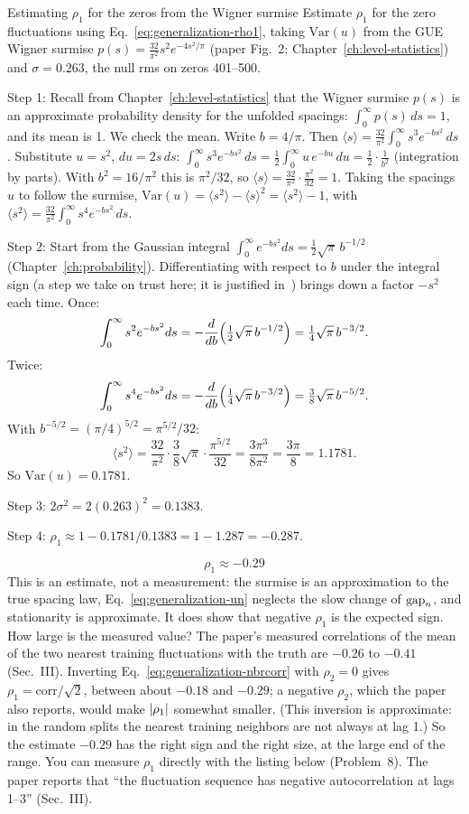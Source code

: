 \begin{sample}{Estimating $\rho_1$ for the zeros from the Wigner surmise}
Estimate $\rho_1$ for the zero fluctuations using Eq.~\eqref{eq:generalization-rho1}, taking $\mathrm{Var}(u)$ from the GUE Wigner surmise $p(s)=\frac{32}{\pi^2}s^2e^{-4s^2/\pi}$ (paper Fig.~2; Chapter~\ref{ch:level-statistics}) and $\sigma=0.263$, the null rms on zeros 401--500.

Step 1: Recall from Chapter~\ref{ch:level-statistics} that the Wigner surmise $p(s)$ is an approximate probability density for the unfolded spacings: $\int_0^\infty p(s)\,ds=1$, and its mean is 1. We check the mean. Write $b=4/\pi$. Then $\langle s\rangle=\frac{32}{\pi^2}\int_0^\infty s^3e^{-bs^2}\,ds$. Substitute $u=s^2$, $du=2s\,ds$: $\int_0^\infty s^3e^{-bs^2}\,ds=\frac12\int_0^\infty u\,e^{-bu}\,du=\frac12\cdot\frac1{b^2}$ (integration by parts). With $b^2=16/\pi^2$ this is $\pi^2/32$, so $\langle s\rangle=\frac{32}{\pi^2}\cdot\frac{\pi^2}{32}=1$. Taking the spacings $u$ to follow the surmise, $\mathrm{Var}(u)=\langle s^2\rangle-\langle s\rangle^2=\langle s^2\rangle-1$, with $\langle s^2\rangle=\frac{32}{\pi^2}\int_0^\infty s^4e^{-bs^2}\,ds$.

Step 2: Start from the Gaussian integral $\int_0^\infty e^{-bs^2}ds=\frac12\sqrt{\pi}\,b^{-1/2}$ (Chapter~\ref{ch:probability}). Differentiating with respect to $b$ under the integral sign (a step we take on trust here; it is justified in~\cite{rhb}) brings down a factor $-s^2$ each time. Once:
\[
\int_0^\infty s^2e^{-bs^2}ds=-\frac{d}{db}\Bigl(\tfrac12\sqrt\pi\,b^{-1/2}\Bigr)=\tfrac14\sqrt\pi\,b^{-3/2}.
\]
Twice:
\[
\int_0^\infty s^4e^{-bs^2}ds=-\frac{d}{db}\Bigl(\tfrac14\sqrt\pi\,b^{-3/2}\Bigr)=\tfrac38\sqrt\pi\,b^{-5/2}.
\]
With $b^{-5/2}=(\pi/4)^{5/2}=\pi^{5/2}/32$:
\[
\langle s^2\rangle=\frac{32}{\pi^2}\cdot\frac38\sqrt\pi\cdot\frac{\pi^{5/2}}{32}=\frac{3\pi^3}{8\pi^2}=\frac{3\pi}{8}=1.1781.
\]
So $\mathrm{Var}(u)=0.1781$.

Step 3: $2\sigma^2=2(0.263)^2=0.1383$.

Step 4: $\rho_1\approx1-0.1781/0.1383=1-1.287=-0.287$.

\[
\boxed{\rho_1\approx-0.29}
\]
This is an estimate, not a measurement: the surmise is an approximation to the true spacing law, Eq.~\eqref{eq:generalization-un} neglects the slow change of $\mathrm{gap}_n$, and stationarity is approximate. It does show that negative $\rho_1$ is the expected sign. How large is the measured value? The paper's measured correlations of the mean of the two nearest training fluctuations with the truth are $-0.26$ to $-0.41$ (Sec.~III). Inverting Eq.~\eqref{eq:generalization-nbrcorr} with $\rho_2=0$ gives $\rho_1=\mathrm{corr}/\sqrt2$, between about $-0.18$ and $-0.29$; a negative $\rho_2$, which the paper also reports, would make $\left\lvert \rho_1\right\rvert$ somewhat smaller. (This inversion is approximate: in the random splits the nearest training neighbors are not always at lag 1.) So the estimate $-0.29$ has the right sign and the right size, at the large end of the range. You can measure $\rho_1$ directly with the listing below (Problem~8). The paper reports that ``the fluctuation sequence has negative autocorrelation at lags 1--3'' (Sec.~III).
\end{sample}

